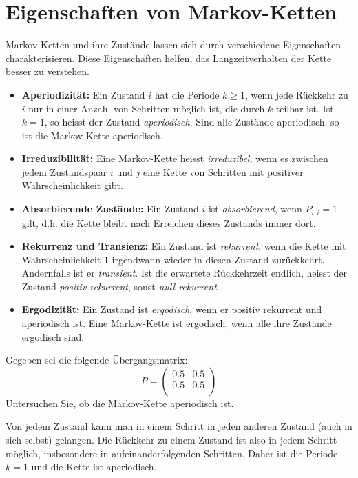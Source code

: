 \chapter{Eigenschaften von Markov-Ketten}\label{app:markov-properties}

Markov-Ketten und ihre Zustände lassen sich durch verschiedene Eigenschaften charakterisieren. Diese Eigenschaften helfen, das Langzeitverhalten der Kette besser zu verstehen.

\begin{itemize}
    \item \textbf{Aperiodizität:} Ein Zustand $i$ hat die Periode $k \geq 1$, wenn jede Rückkehr zu $i$ nur in einer Anzahl von Schritten möglich ist, die durch $k$ teilbar ist. Ist $k=1$, so heisst der Zustand \emph{aperiodisch}. Sind alle Zustände aperiodisch, so ist die Markov-Kette aperiodisch.
    \item \textbf{Irreduzibilität:} Eine Markov-Kette heisst \emph{irreduzibel}, wenn es zwischen jedem Zustandspaar $i$ und $j$ eine Kette von Schritten mit positiver Wahrscheinlichkeit gibt.
    \item \textbf{Absorbierende Zustände:} Ein Zustand $i$ ist \emph{absorbierend}, wenn $P_{i,i} = 1$ gilt, d.h. die Kette bleibt nach Erreichen dieses Zustands immer dort.
    \item \textbf{Rekurrenz und Transienz:} Ein Zustand ist \emph{rekurrent}, wenn die Kette mit Wahrscheinlichkeit $1$ irgendwann wieder in diesen Zustand zurückkehrt. Andernfalls ist er \emph{transient}. Ist die erwartete Rückkehrzeit endlich, heisst der Zustand \emph{positiv rekurrent}, sonst \emph{null-rekurrent}.
    \item \textbf{Ergodizität:} Ein Zustand ist \emph{ergodisch}, wenn er positiv rekurrent und aperiodisch ist. Eine Markov-Kette ist ergodisch, wenn alle ihre Zustände ergodisch sind.
\end{itemize}

\begin{mychallenge}[Aperiodizität]
    Gegeben sei die folgende Übergangsmatrix:
    \[
        P = \begin{pmatrix}
            0.5 & 0.5 \\
            0.5  & 0.5 \\
        \end{pmatrix}
    \]
    Untersuchen Sie, ob die Markov-Kette aperiodisch ist.

    \begin{myanswer}
        Von jedem Zustand kann man in einem Schritt in jeden anderen Zustand (auch in sich selbst) gelangen. Die Rückkehr zu einem Zustand ist also in jedem Schritt möglich, insbesondere in aufeinanderfolgenden Schritten. Daher ist die Periode $k=1$ und die Kette ist aperiodisch.
    \end{myanswer}
\end{mychallenge}

